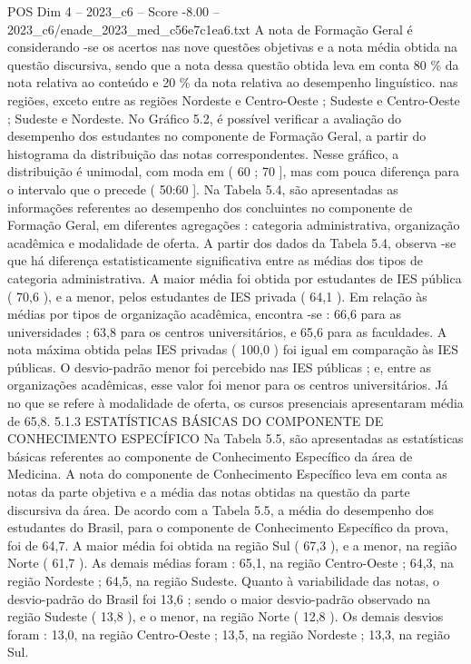 \begin{textsample}{POS Dim 4 – 2023\_c6 – Score -8.00 – 2023\_c6/enade\_2023\_med\_c56e7c1ea6.txt}
A nota de Formação Geral é considerando -se os acertos nas nove questões objetivas e a nota média obtida na questão discursiva, sendo que a nota dessa questão obtida leva em conta 80 \% da nota relativa ao conteúdo e 20 \% da nota relativa ao desempenho linguístico. nas regiões, exceto entre as regiões Nordeste e Centro-Oeste ; Sudeste e Centro-Oeste ; Sudeste e Nordeste.
No Gráfico 5.2, é possível verificar a avaliação do desempenho dos estudantes no componente de Formação Geral, a partir do histograma da distribuição das notas correspondentes.
Nesse gráfico, a distribuição é unimodal, com moda em ( 60 ; 70 ], mas com pouca diferença para o intervalo que o precede ( 50:60 ].
Na Tabela 5.4, são apresentadas as informações referentes ao desempenho dos concluintes no componente de Formação Geral, em diferentes agregações : categoria administrativa, organização acadêmica e modalidade de oferta.
A partir dos dados da Tabela 5.4, observa -se que há diferença estatisticamente significativa entre as médias dos tipos de categoria administrativa.
A maior média foi obtida por estudantes de IES pública ( 70,6 ), e a menor, pelos estudantes de IES privada ( 64,1 ).
Em relação às médias por tipos de organização acadêmica, encontra -se : 66,6 para as universidades ; 63,8 para os centros universitários, e 65,6 para as faculdades.
A nota máxima obtida pelas IES privadas ( 100,0 ) foi igual em comparação às IES públicas.
O desvio-padrão menor foi percebido nas IES públicas ; e, entre as organizações acadêmicas, esse valor foi menor para os centros universitários.
Já no que se refere à modalidade de oferta, os cursos presenciais apresentaram média de 65,8. 5.1.3 ESTATÍSTICAS BÁSICAS DO COMPONENTE DE CONHECIMENTO ESPECÍFICO Na Tabela 5.5, são apresentadas as estatísticas básicas referentes ao componente de Conhecimento Específico da área de Medicina.
A nota do componente de Conhecimento Específico leva em conta as notas da parte objetiva e a média das notas obtidas na questão da parte discursiva da área.
De acordo com a Tabela 5.5, a média do desempenho dos estudantes do Brasil, para o componente de Conhecimento Específico da prova, foi de 64,7.
A maior média foi obtida na região Sul ( 67,3 ), e a menor, na região Norte ( 61,7 ).
As demais médias foram : 65,1, na região Centro-Oeste ; 64,3, na região Nordeste ; 64,5, na região Sudeste.
Quanto à variabilidade das notas, o desvio-padrão do Brasil foi 13,6 ; sendo o maior desvio-padrão observado na região Sudeste ( 13,8 ), e o menor, na região Norte ( 12,8 ).
Os demais desvios foram : 13,0, na região Centro-Oeste ; 13,5, na região Nordeste ; 13,3, na região Sul.

\end{textsample}
